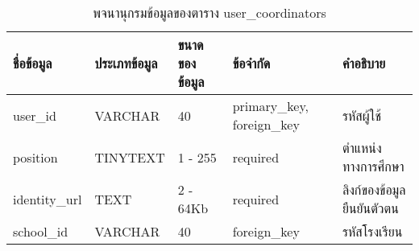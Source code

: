 \begin{table}[H]
    \caption{พจนานุกรมข้อมูลของตาราง user\_coordinators}
    \label{tab:database-user-coordinators}
    \begin{tabularx}{\textwidth}{ | p{1.75cm} | p{2.20cm} | p{2.45cm} | p{2cm} | X | }
    \hline
    \textbf{ชื่อข้อมูล} & \textbf{ประเภทข้อมูล} & \textbf{ขนาดของข้อมูล} & \textbf{ข้อจำกัด} & \textbf{คำอธิบาย} \\
    \hline
    user\_id & VARCHAR & 40 & primary\_key, foreign\_key & รหัสผู้ใช้ \\
    \hline
    position & TINYTEXT & 1 - 255 & required & ตำแหน่งทางการศึกษา \\
    \hline
    identity\_url & TEXT & 2 - 64Kb & required & ลิงก์ของข้อมูลยืนยันตัวตน \\
    \hline
    school\_id & VARCHAR & 40 & foreign\_key & รหัสโรงเรียน \\
    \hline
    \end{tabularx}
\end{table}
